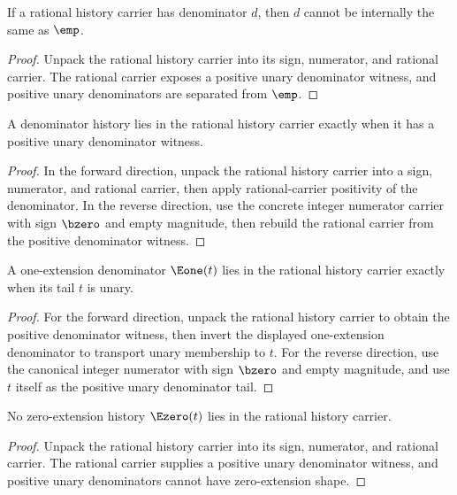 \begin{theorem}
\label{thm:rat-history-carrier-not-empty}
If a rational history carrier has denominator $d$, then $d$ cannot be
internally the same as $\emp$.
\end{theorem}
\begin{proof}
Unpack the rational history carrier into its sign, numerator, and rational
carrier. The rational carrier exposes a positive unary denominator witness, and
positive unary denominators are separated from $\emp$.
\end{proof}

\begin{theorem}
\label{thm:rat-history-carrier-positive-denominator-equivalence}
A denominator history lies in the rational history carrier exactly when it has
a positive unary denominator witness.
\end{theorem}
\begin{proof}
In the forward direction, unpack the rational history carrier into a sign,
numerator, and rational carrier, then apply rational-carrier positivity of the
denominator. In the reverse direction, use the concrete integer numerator
carrier with sign $\bzero$ and empty magnitude, then rebuild the rational
carrier from the positive denominator witness.
\end{proof}

\begin{theorem}
\label{thm:rat-history-carrier-e1-tail-unary-iff}
A one-extension denominator $\Eone(t)$ lies in the rational history carrier
exactly when its tail $t$ is unary.
\end{theorem}
\begin{proof}
For the forward direction, unpack the rational history carrier to obtain the
positive denominator witness, then invert the displayed one-extension
denominator to transport unary membership to $t$. For the reverse direction,
use the canonical integer numerator with sign $\bzero$ and empty magnitude,
and use $t$ itself as the positive unary denominator tail.
\end{proof}

\begin{theorem}
\label{thm:rat-history-carrier-e0-absurd}
No zero-extension history $\Ezero(t)$ lies in the rational history carrier.
\end{theorem}
\begin{proof}
Unpack the rational history carrier into its sign, numerator, and rational
carrier. The rational carrier supplies a positive unary denominator witness,
and positive unary denominators cannot have zero-extension shape.
\end{proof}

